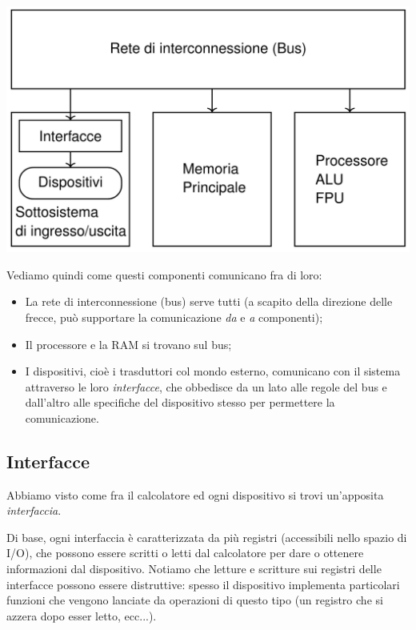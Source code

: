 \documentclass[a4paper,11pt]{article}
\begin{document}
\begin{center}
	\includegraphics[scale=0.35]{../figures/struttura_calc.png}
\end{center}

Vediamo quindi come questi componenti comunicano fra di loro:
\begin{itemize}
	\item La rete di interconnessione (bus) serve tutti (a scapito della direzione delle frecce, può supportare la comunicazione \textit{da} e \textit{a} componenti);
	\item Il processore e la RAM si trovano sul bus;
	\item I dispositivi, cioè i trasduttori col mondo esterno, comunicano con il sistema attraverso le loro \textit{interfacce}, che obbedisce da un lato alle regole del bus e dall'altro alle specifiche del dispositivo stesso per permettere la comunicazione.
\end{itemize}

\subsection{Interfacce}
Abbiamo visto come fra il calcolatore ed ogni dispositivo si trovi un'apposita \textit{interfaccia}.

Di base, ogni interfaccia è caratterizzata da più registri (accessibili nello spazio di I/O), che possono essere scritti o letti dal calcolatore per dare o ottenere informazioni dal dispositivo.
Notiamo che letture e scritture sui registri delle interfacce possono essere distruttive: spesso il dispositivo implementa particolari funzioni che vengono lanciate da operazioni di questo tipo (un registro che si azzera dopo esser letto, ecc...).
\end{document}
